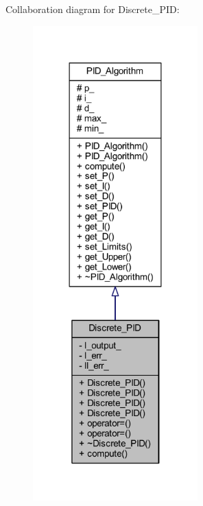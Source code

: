 Collaboration diagram for Discrete\+\_\+\+P\+ID\+:
\nopagebreak
\begin{figure}[H]
\begin{center}
\leavevmode
\includegraphics[width=180pt]{class_discrete___p_i_d__coll__graph}
\end{center}
\end{figure}
